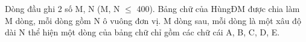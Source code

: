 Dòng đầu ghi 2 số M, N (M, N  $\le$  400). Bảng chữ của HùngĐM được chia làm M dòng, mỗi dòng gồm N ô vuông đơn vị. M dòng sau, mỗi dòng là một xâu độ dài N thể hiện một dòng của bảng chữ chỉ gồm các chữ cái A, B, C, D, E.  

\